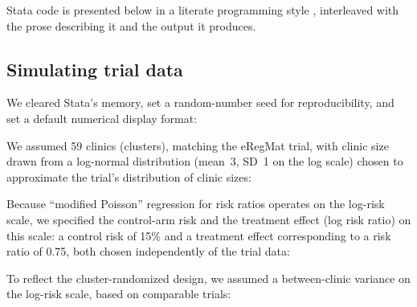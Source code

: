 Stata code is presented below in a literate programming style
\citep{knuth1984}, interleaved with the prose describing it and the output
it produces.

\subsection{Simulating trial data}

We cleared Stata's memory, set a random-number seed for reproducibility,
and set a default numerical display format:

\begin{minipage}{\linewidth}
\begin{stlog}
\nullskip
\end{stlog}
\end{minipage}

We assumed 59 clinics (clusters), matching the eRegMat trial, with clinic
size drawn from a log-normal distribution (mean~3, SD~1 on the log scale)
chosen to approximate the trial's distribution of clinic sizes:

\begin{minipage}{\linewidth}
\begin{stlog}
\nullskip
\end{stlog}
\end{minipage}

Because ``modified Poisson'' regression for risk ratios
operates on the log-risk scale, we specified the control-arm risk and the
treatment effect (log risk ratio) on this scale: a control risk of 15\%
and a treatment effect corresponding to a risk ratio of 0.75, both chosen
independently of the trial data:

\begin{minipage}{\linewidth}
\begin{stlog}
\nullskip
\end{stlog}
\end{minipage}

To reflect the cluster-randomized design, we assumed a between-clinic
variance on the log-risk scale, based on comparable trials:

\begin{minipage}{\linewidth}
\begin{stlog}
\nullskip
\end{stlog}
\end{minipage}

